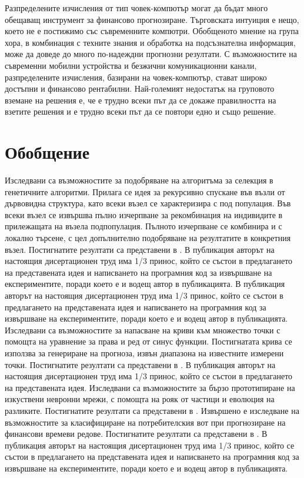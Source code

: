 Разпределените изчисления от тип човек-компютър могат да бъдат много обещаващ инструмент за финансово прогнозиране. Търговската интуиция е нещо, което не е постижимо със съвременните компютри. Обобщеното мнение на група хора, в комбинация с техните знания и обработка на подсъзнателна информация, може да доведе до много по-надеждни прогнозни резултати. С възможностите на съвременни мобилни устройства и безжични комуникационни канали, разпределените изчисления, базирани на човек-компютър, стават широко достъпни и финансово рентабилни. Най-големият недостатък на груповото вземане на решения е, че е трудно всеки път да се докаже правилността на взетите решения и е трудно всеки път да се повтори едно и също решение.

\section{Обобщение}

Изследвани са възможностите за подобряване на алгоритъма за селекция в генетичните алгоритми. Прилага се идея за рекурсивно спускане във възли от дървовидна структура, като всеки възел се характеризира с под популация. Във всеки възел се извършва пълно изчерпване за рекомбинация на индивидите в прилежащата на възела подпопулация. Пълното изчерпване се комбинира и с локално търсене, с цел допълнително подобряване на резултатите в конкретния възел. Постигнатите резултати са представени в \cite{Tomov-01,Tomov-02}. В публикация \cite{Tomov-01} авторът на настоящия дисертационен труд има 1/3 принос, който се състои в предлагането на представената идея и написването на програмния код за извършване на експериментите, поради което е и водещ автор в публикацията. В публикация \cite{Tomov-02} авторът на настоящия дисертационен труд има 1/3 принос, който се състои в предлагането на представената идея и написването на програмния код за извършване на експериментите, поради което е и водещ автор в публикацията. Изследвани са възможностите за напасване на криви към множество точки с помощта на уравнение за права и ред от синус функции. Постигнатата крива се използва за генериране на прогноза, извън диапазона на известните измерени точки. Постигнатите резултати са представени в \cite{Velichkova-01}. В публикация \cite{Velichkova-01} авторът на настоящия дисертационен труд има 1/3 принос, който се състои в предлагането на представената идея. Изследвани са възможностите за бързо прототипиране на изкуствени невронни мрежи, с помощта на рояк от частици и еволюция на разликите.  Постигнатите резултати са представени в \cite{Tomov-04}. Извършено е изследване на възможностите за класифициране на потребителския вот при прогнозиране на финансови времеви редове. Постигнатите резултати са представени в \cite{Tomov-03}. В публикация \cite{Tomov-03} авторът на настоящия дисертационен труд има 1/3 принос, който се състои в предлагането на представената идея и написването на програмния код за извършване на експериментите, поради което е и водещ автор в публикацията.

